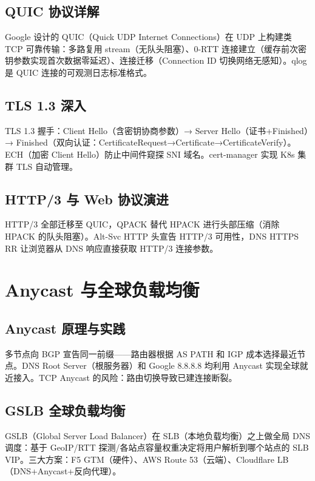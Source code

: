 \documentclass[12pt,UTF8]{ctexbook}
\begin{document}
  \section{QUIC 协议详解}

Google 设计的 QUIC（Quick UDP Internet Connections）在 UDP 上构建类 TCP 可靠传输：多路复用 stream（无队头阻塞）、0-RTT 连接建立（缓存前次密钥参数实现首次数据零延迟）、连接迁移（Connection ID 切换网络无感知）。qlog 是 QUIC 连接的可观测日志标准格式。

  \section{TLS 1.3 深入}

TLS 1.3 握手：Client Hello（含密钥协商参数）→ Server Hello（证书+Finished）→ Finished（双向认证：CertificateRequest→Certificate→CertificateVerify）。ECH（加密 Client Hello）防止中间件窥探 SNI 域名。cert-manager 实现 K8s 集群 TLS 自动管理。

  \section{HTTP/3 与 Web 协议演进}

HTTP/3 全部迁移至 QUIC，QPACK 替代 HPACK 进行头部压缩（消除 HPACK 的队头阻塞）。Alt-Svc HTTP 头宣告 HTTP/3 可用性，DNS HTTPS RR 让浏览器从 DNS 响应直接获取 HTTP/3 连接参数。


\chapter{Anycast 与全球负载均衡}
\label{chap:anycast-gslb}

  \section{Anycast 原理与实践}

多节点向 BGP 宣告同一前缀——路由器根据 AS PATH 和 IGP 成本选择最近节点。DNS Root Server（根服务器）和 Google 8.8.8.8 均利用 Anycast 实现全球就近接入。TCP Anycast 的风险：路由切换导致已建连接断裂。

  \section{GSLB 全球负载均衡}

GSLB（Global Server Load Balancer）在 SLB（本地负载均衡）之上做全局 DNS 调度：基于 GeoIP/RTT 探测/各站点容量权重决定将用户解析到哪个站点的 SLB VIP。三大方案：F5 GTM（硬件）、AWS Route 53（云端）、Cloudflare LB（DNS+Anycast+反向代理）。
\end{document}
